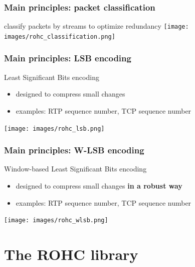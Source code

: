 \documentclass[utf8]{beamer}
\begin{document}
\begin{frame}
	\frametitle{Main principles: packet classification}
	\begin{block}{classify packets by streams to optimize redundancy}
		\texttt{[image: images/rohc\_classification.png]}
	\end{block}
\end{frame}

\begin{frame}
	\frametitle{Main principles: LSB encoding}
	\begin{block}{Least Significant Bits encoding}
		\begin{itemize}
			\item designed to compress small changes
			\item examples: RTP sequence number, TCP sequence number
		\end{itemize}
		\texttt{[image: images/rohc\_lsb.png]}
	\end{block}
\end{frame}

\begin{frame}
	\frametitle{Main principles: W-LSB encoding}
	\begin{block}{Window-based Least Significant Bits encoding}
		\begin{itemize}
			\item designed to compress small changes {\bf in a robust way}
			\item examples: RTP sequence number, TCP sequence number
		\end{itemize}
		\texttt{[image: images/rohc\_wlsb.png]}
	\end{block}
\end{frame}





\section{The ROHC library}
\end{document}
